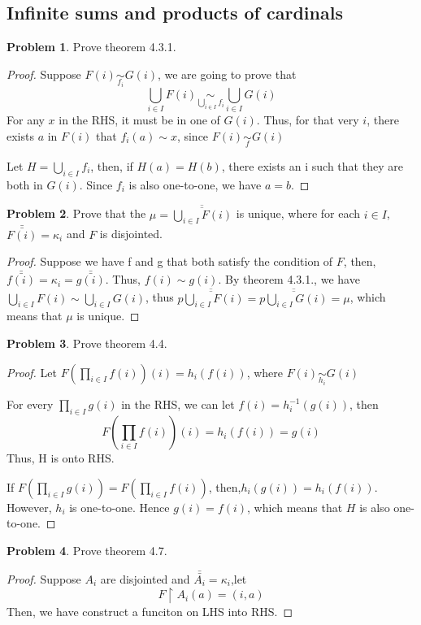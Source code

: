 \documentclass[a4paper,11pt]{article}%
\theoremstyle{remark}
\theoremstyle{definition}
\newtheorem{problem}{Problem}[subsection]
\begin{document}
\subsection{Infinite sums and products of cardinals}
\begin{problem}
    Prove theorem 4.3.1.
    \begin{proof}
        Suppose $F(i)\underset{f_i}{\sim}G(i)$, we are going to prove that 
        \[\bigcup_{i\in I}F(i)\underset{\bigcup_{i\in I}f_i}{\sim}\bigcup_{i\in I} G(i)\]
        For any  $x$ in the RHS, it must be in one of $G(i)$. Thus, for 
        that very $i$, there exists $a$ in $F(i)$ that $f_i(a)\sim x$, since $F(i)\underset{f}{\sim}G(i)$

        Let $H=\bigcup_{i\in I}f_i$, then, if $H(a)=H(b)$, there exists an i such that they are both in $G(i)$.
        Since $f_i$ is also one-to-one, we have $a=b$.
    \end{proof}
\end{problem}
\begin{problem}
    Prove that the $\mu=\overline{\overline{\bigcup_{i\in I}F(i)}}$ is unique, where for each $i\in I$,$\bar{\bar{F(i)}}=\kappa_i$ and $F$ is disjointed.
    \begin{proof}
        Suppose we have f and g that both satisfy the condition of $F$,
        then, $\bar{\bar{f(i)}}=\kappa_i=\bar{\bar{g(i)}}$. Thus, $f(i)\sim g(i)$. By theorem 4.3.1.,
        we have $\bigcup_{i\in I}F(i)\sim\bigcup_{i\in I}G(i)$, thus $\overline{\overline{p\bigcup_{i\in I}F(i)}}=\overline{\overline{p\bigcup_{i\in I}G(i)}}=\mu$,
        which means that $\mu$ is unique.
    \end{proof}
\end{problem}
\begin{problem}
    Prove theorem 4.4.
    \begin{proof}
        Let $F(\prod_{i\in I}f(i))(i)=h_i(f(i))$, where $F(i)\underset{h_i}{\sim}G(i)$

        For every $\prod_{i\in I}g(i)$ in the RHS, we can let $f(i)=h_i^{-1}(g(i))$, then 
        \[F(\prod_{i\in I}f(i))(i)=h_i(f(i))=g(i)\]
        Thus, H is onto RHS.

        If $F(\prod_{i\in I}g(i))=F(\prod_{i\in I}f(i))$, then,$h_i(g(i))=h_i(f(i))$. However, $h_i$ is one-to-one.
        Hence $g(i)=f(i)$, which means that $H$ is also one-to-one.
    \end{proof}
\end{problem}
\begin{problem}
    Prove theorem 4.7.
    \begin{proof}
    Suppose $A_i$ are disjointed and $\bar{\bar{A_i}}=\kappa_i$,let
    \[F\upharpoonright A_i(a)=(i,a)\]
    Then, we have construct a funciton on LHS into RHS.
    \end{proof}
\end{problem}
\end{document}
